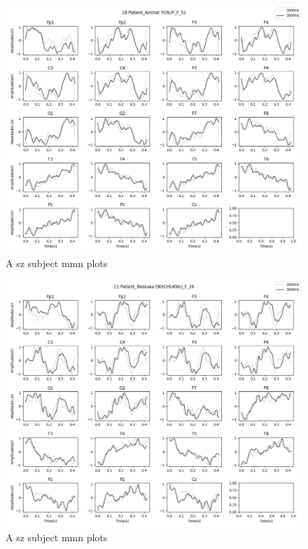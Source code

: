 \documentclass[10pt]{article}
\begin{document}
\begin{figure}[H]
  \includegraphics[width=16cm]{../../../data_analysis_results/MMN/time_series/Patient/18.png}
  \caption{A \gls{sz} subject \gls{mmn} plots}
\end{figure}
\begin{figure}[H]
  \includegraphics[width=16cm]{../../../data_analysis_results/MMN/time_series/Patient/21.png}
  \caption{A \gls{sz} subject \gls{mmn} plots}
\end{figure}
\end{document}
